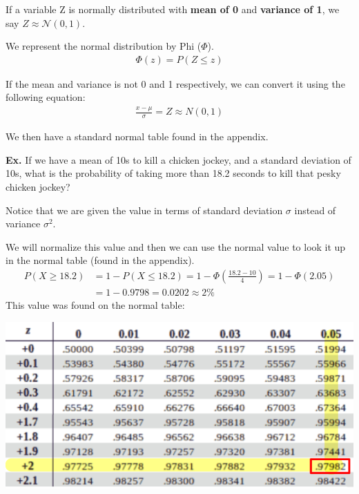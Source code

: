 \documentclass[12pt,letterpaper]{article} \usepackage{amsmath} \usepackage{graphicx} \usepackage[margin=1in]{geometry} \usepackage{longtable}  \usepackage{amssymb}
\begin{document}
	If a variable Z is normally distributed with \textbf{mean of 0} and \textbf{variance of 1}, we say $Z \approx \mathcal{N}(0,1)$.
	
	We represent the normal distribution by Phi ($\Phi$). 
	\begin{align*}
		\Phi(z) = P(Z\le z)
	\end{align*}

	If the mean and variance is not 0 and 1 respectively, we can convert it using the following equation:
	\begin{align*}
		\frac{x-\mu}{\sigma} = Z \approx N(0,1)
	\end{align*}

	We then have a standard normal table found in the appendix. 
	
	\begin{mdframed}
		\textbf{Ex. }If we have a mean of 10s to kill a chicken jockey, and a standard deviation of 10s, what is the probability of taking more than 18.2 seconds to kill that pesky chicken jockey?
		
		Notice that we are given the value in terms of standard deviation $\sigma$ instead of variance $\sigma^2$. 
		
		We will normalize this value and then we can use the normal value to look it up in the normal table (found in the appendix).
		\begin{align*}
			P(X\ge 18.2) &= 1-P(X\le 18.2) = 1-\Phi\left(\frac{18.2-10}{4}\right) = 1-\Phi\left(2.05\right) \\
			&= 1-0.9798=0.0202 \approx 2\%
		\end{align*}
		This value was found on the normal table:
		\begin{center}
			\includegraphics[width=0.5\linewidth]{normal-ex2}
		\end{center}
		
	\end{mdframed}
	
\end{document}
